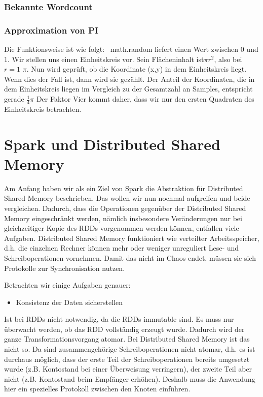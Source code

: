 \documentclass[letterpaper]{article}
\begin{document}
\subsubsection{Bekannte Wordcount}



\subsubsection{Approximation von PI}


Die Funktionsweise ist wie folgt: \ math.random liefert einen Wert
zwischen 0 und 1. Wir stellen uns einen Einheitskreis vor. Sein
Flächeninhalt ist$\pi r^2$, also bei $r=1$ $\pi$. Nun wird geprüft, ob die Koordinate (x,y) in
dem Einheitskreis liegt. Wenn dies der Fall ist, dann wird sie gezählt.
Der Anteil der Koordinaten, die in dem Einheitskreis liegen im
Vergleich zu der Gesamtzahl an Samples, entspricht gerade
$\frac{1}{4}\pi$ Der Faktor Vier
kommt daher, dass wir nur den ersten Quadraten des Einheitskreis
betrachten.

\section[Spark und Distributed Shared
Memory]{\rmfamily Spark und Distributed Shared
Memory}
Am Anfang haben wir als ein Ziel von Spark die Abstraktion für
Distributed Shared Memory beschrieben. Das wollen wir nun nochmal
aufgreifen und beide vergleichen. Dadurch, dass die Operationen
gegenüber der Distributed Shared Memory eingeschränkt werden, nämlich
insbesondere Veränderungen nur bei gleichzeitiger Kopie des RDDs
vorgenommen werden können, entfallen viele Aufgaben. Distributed Shared
Memory funktioniert wie verteilter Arbeitsspeicher, d.h. die einzelnen
Rechner können mehr oder weniger unreguliert Lese- und
Schreiboperationen vornehmen. Damit das nicht im Chaos endet, müssen
sie sich Protokolle zur Synchronisation nutzen. 

Betrachten wir einige Aufgaben genauer:


\begin{itemize}
\item Konsistenz der Daten sicherstellen
\end{itemize}
Ist bei RDDs nicht notwendig, da die RDDs immutable sind. Es muss nur
überwacht werden, ob das RDD vollständig erzeugt wurde. Dadurch wird der
ganze Transformationsvorgang atomar. Bei Distributed Shared Memory ist
das nicht so. Da sind zusammengehörige Schreiboperationen nicht atomar,
d.h. es ist durchaus möglich, dass der erste Teil der
Schreiboperationen bereits umgesetzt wurde (z.B. Kontostand bei einer
Überweisung verringern), der zweite Teil aber nicht (z.B. Kontostand
beim Empfänger erhöhen). Deshalb muss die Anwendung hier ein spezielles
Protokoll zwischen den Knoten einführen.
\end{document}
